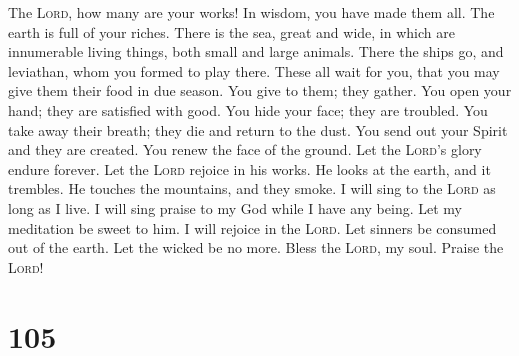  The \textsc{Lord}, how many are your works! In wisdom,
you have made them all. The earth is full of your riches.
 There is the sea, great and wide, in which are
innumerable living things, both small and large animals. 
There the ships go, and leviathan, whom you formed to play there.
 These all wait for you, that you may give them their
food in due season.  You give to them; they gather. You
open your hand; they are satisfied with good.  You hide
your face; they are troubled. You take away their breath; they die and
return to the dust.  You send out your Spirit and they
are created. You renew the face of the ground.  Let the
\textsc{Lord}'s glory endure forever. Let the \textsc{Lord} rejoice in
his works.  He looks at the earth, and it trembles. He
touches the mountains, and they smoke.  I will sing to
the \textsc{Lord} as long as I live. I will sing praise to my God while
I have any being.  Let my meditation be sweet to him. I
will rejoice in the \textsc{Lord}.  Let sinners be
consumed out of the earth. Let the wicked be no more. Bless the
\textsc{Lord}, my soul. Praise the \textsc{Lord}!

\hypertarget{section-104}{%
\section{105}\label{section-104}}

